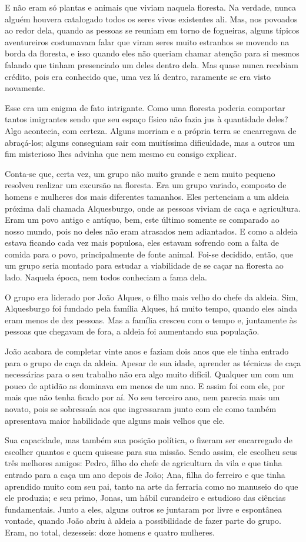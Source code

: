 E não eram só plantas e animais que viviam naquela floresta. Na verdade, nunca alguém houvera catalogado todos os seres vivos existentes ali. Mas, nos povoados ao redor dela, quando as pessoas se reuniam em torno de fogueiras, alguns típicos aventureiros costumavam falar que viram seres muito estranhos se movendo na borda da floresta, e isso quando eles não queriam chamar atenção para si mesmos falando que tinham presenciado um deles dentro dela. Mas quase nunca recebiam crédito, pois era conhecido que, uma vez lá dentro, raramente se era visto novamente.

Esse era um enigma de fato intrigante. Como uma floresta poderia comportar tantos imigrantes sendo que seu espaço físico não fazia jus à quantidade deles? Algo acontecia, com certeza. Alguns morriam e a própria terra se encarregava de abraçá-los; alguns conseguiam sair com muitíssima dificuldade, mas a outros um fim misterioso lhes advinha que nem mesmo eu consigo explicar.

Conta-se que, certa vez, um grupo não muito grande e nem muito pequeno resolveu realizar um excursão na floresta. Era um grupo variado, composto de homens e mulheres dos mais diferentes tamanhos. Eles pertenciam a um aldeia próxima dali chamada Alquesburgo, onde as pessoas viviam de caça e agricultura. Eram um povo antigo e antíquo, bem, este último somente se comparado ao nosso mundo, pois no deles não eram atrasados nem adiantados. E como a aldeia estava ficando cada vez mais populosa, eles estavam sofrendo com a falta de comida para o povo, principalmente de fonte animal. Foi-se decidido, então, que um grupo seria montado para estudar a viabilidade de se caçar na floresta ao lado. Naquela época, nem todos conheciam a fama dela.

O grupo era liderado por João Alques, o filho mais velho do chefe da aldeia. Sim, Alquesburgo foi fundado pela família Alques, há muito tempo, quando eles ainda eram menos de dez pessoas. Mas a família cresceu com o tempo e, juntamente às pessoas que chegavam de fora, a aldeia foi aumentando sua população.

João acabara de completar vinte anos e faziam dois anos que ele tinha entrado para o grupo de caça da aldeia. Apesar de sua idade, aprender as técnicas de caça necessárias para o seu trabalho não era algo muito difícil. Qualquer um com um pouco de aptidão as dominava em menos de um ano. E assim foi com ele, por mais que não tenha ficado por aí. No seu terceiro ano, nem parecia mais um novato, pois se sobressaía aos que ingressaram junto com ele como também apresentava maior habilidade que alguns mais velhos que ele.

Sua capacidade, mas também sua posição política, o fizeram ser encarregado de escolher quantos e quem quisesse para sua missão. Sendo assim, ele escolheu seus três melhores amigos: Pedro, filho do chefe de agricultura da vila e que tinha entrado para a caça um ano depois de João; Ana, filha do ferreiro e que tinha aprendido muito com seu pai, tanto na arte da ferraria como no manuseio do que ele produzia; e seu primo, Jonas, um hábil curandeiro e estudioso das ciências fundamentais. Junto a eles, alguns outros se juntaram por livre e espontânea vontade, quando João abriu à aldeia a possibilidade de fazer parte do grupo. Eram, no total, dezesseis: doze homens e quatro mulheres.